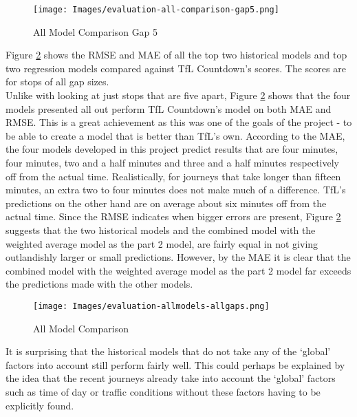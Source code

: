 \begin{figure}[H]
\begin{center}
    \texttt{[image: Images/evaluation-all-comparison-gap5.png]}
    \caption{All Model Comparison Gap 5}
    \label{fig:all-model-comparison-gap5}
\end{center}
\end{figure}

Figure \ref{fig:all-model-comparison} shows the RMSE and MAE of all the top two historical models and top two regression models compared against TfL Countdown's scores. The scores are for stops of all gap sizes. \\

Unlike with looking at just stops that are five apart, Figure \ref{fig:all-model-comparison} shows that the four models presented all out perform TfL Countdown's model on both MAE and RMSE. This is a great achievement as this was one of the goals of the project - to be able to create a model that is better than TfL's own. According to the MAE, the four models developed in this project predict results that are four minutes, four minutes, two and a half minutes and three and a half minutes respectively off from the actual time. Realistically, for journeys that take longer than fifteen minutes, an extra two to four minutes does not make much of a difference. TfL's predictions on the other hand are on average about six minutes off from the actual time. Since the RMSE indicates when bigger errors are present, Figure \ref{fig:all-model-comparison} suggests that the two historical models and the combined model with the weighted average model as the part 2 model, are fairly equal in not giving outlandishly larger or small predictions. However, by the MAE it is clear that the combined model with the weighted average model as the part 2 model far exceeds the predictions made with the other models.

\begin{figure}[H]
\begin{center}
    \texttt{[image: Images/evaluation-allmodels-allgaps.png]}
    \caption{All Model Comparison}
    \label{fig:all-model-comparison}
\end{center}
\end{figure}

It is surprising that the historical models that do not take any of the `global' factors into account still perform fairly well. This could perhaps be explained by the idea that the recent journeys already take into account the `global' factors such as time of day or traffic conditions without these factors having to be explicitly found.

\clearpage